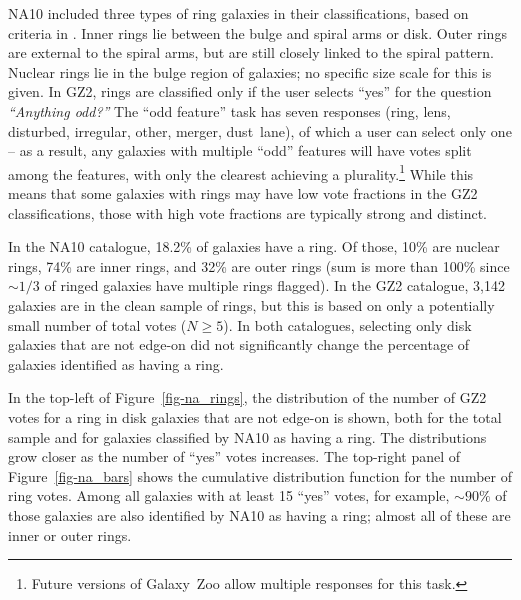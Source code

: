 \documentclass[useAMS,usenatbib]{mn2e}
\begin{document}
NA10 included three types of ring galaxies in their classifications, based on criteria in \citet{but96}. Inner rings lie between the bulge and spiral arms or disk. Outer rings are external to the spiral arms, but are still closely linked to the spiral pattern. Nuclear rings lie in the bulge region of galaxies; no specific size scale for this is given. In GZ2, rings are classified only if the user selects ``yes'' for the question {\it ``Anything odd?''} The ``odd feature'' task has seven responses (ring, lens, disturbed, irregular, other, merger, dust~lane), of which a user can select only one -- as a result, any galaxies with multiple ``odd'' features will have votes split among the features, with only the clearest achieving a plurality.\footnote{Future versions of Galaxy~Zoo allow multiple responses for this task.} While this means that some galaxies with rings may have low vote fractions in the GZ2 classifications, those with high vote fractions are typically strong and distinct.

In the NA10 catalogue, 18.2\% of galaxies have a ring. Of those, 10\% are nuclear rings, 74\% are inner rings, and 32\% are outer rings (sum is more than 100\% since $\sim1/3$ of ringed galaxies have multiple rings flagged). In the GZ2 catalogue, 3,142 galaxies are in the clean sample of rings, but this is based on only a potentially small number of total votes ($N\geq5$). In both catalogues, selecting only disk galaxies that are not edge-on did not significantly change the percentage of galaxies identified as having a ring. 

In the top-left of Figure~\ref{fig-na_rings}, the distribution of the number of GZ2 votes for a ring in disk galaxies that are not edge-on is shown, both for the total sample and for galaxies classified by NA10 as having a ring. The distributions grow closer as the number of ``yes'' votes increases. The top-right panel of Figure~\ref{fig-na_bars} shows the cumulative distribution function for the number of ring votes. Among all galaxies with at least 15 ``yes'' votes, for example, $\sim90\%$ of those galaxies are also identified by NA10 as having a ring; almost all of these are inner or outer rings.  
\end{document}
